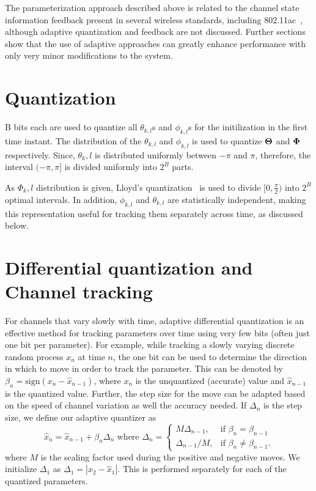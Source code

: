 \documentclass[11pt,a4paper]{report}
\begin{document}
The parameterization approach described above is related
to the channel state information feedback present in several
wireless standards, including 802.11ac~\cite{lou2013comparison}, 
although adaptive quantization and feedback are not discussed. 
Further sections show that the use of adaptive approaches can 
greatly enhance performance with only very minor modifications 
to the system.

\section{Quantization}
\label{sec:quant}
B bits each are used to quantize all $\theta_{k,l}$s and $\phi_{k,l}$s for the
initilization in the first time instant.
The distribution of the $\theta_{k,l}$ and $\phi_{k,l}$ is used to
quantize $\bf{\Theta}$ and $\bf{\Phi}$ respectively. 
Since, $\theta_k,l$ is distributed uniformly between 
$-\pi$ and $\pi$, therefore, the interval $(-\pi,\pi]$ is divided
uniformly into $2^B$ parts.

As $\Phi_k,l$ distribution is given, Lloyd's quantization~\cite{lloyd1982least} 
is used to divide $[0,\frac{\pi}{2})$ into $2^B$ optimal intervals. 
In addition, $\phi_{k,l}$ and
$\theta_{k,l}$ are statistically independent, making this
representation useful for tracking them separately across time, as
discussed below.

\section{Differential quantization and Channel tracking}
\label{sec:track}
For channels that vary slowly with time, adaptive differential
quantization is an effective method for tracking parameters over time
using very few bits (often just one bit per parameter). For example,
while tracking a slowly varying discrete random process $x_n$ at time
$n$, the one bit can be used to determine the direction in which to
move in order to track the parameter. This can be denoted by
$\beta_{n} = \mbox{sign}(x_{n} - \hat{x}_{n-1})$, where $x_n$ is the
unquantized (accurate) value and $\hat{x}_{n-1}$ is the quantized
value. Further, the step size for the move can be adapted based on the
speed of channel variation as well the accuracy needed. If $\Delta_n$
is the step size, we define our adaptive quantizer as
\begin{equation}
\hat{x}_{n} = \hat{x}_{n-1} + \beta_{n}\Delta_{n} \mbox{ where }
\label{delta_eqn}
\Delta_{n} = \begin{cases}
    M \Delta_{n-1}, & \text{if $\beta_{n} = \beta_{n-1}$}\\
    \Delta_{n-1}/M , & \text{if $\beta_{n} \neq \beta_{n-1}$}.
  \end{cases}
\end{equation}
where $M$ is the scaling factor used during the positive and negative
moves. We initialize $\Delta_1$ as $\Delta_1 = |x_{2}-\hat{x}_1|$. This is performed separately for each of the quantized
parameters.
\end{document}

